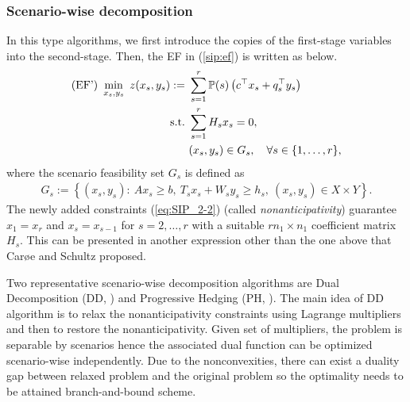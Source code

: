 \subsubsection{Scenario-wise decomposition}
In this type algorithms, we first introduce the copies of the first-stage variables into the second-stage. Then, the EF in (\ref{sip:ef}) is written as below.
\begin{subequations} \label{sip:ef'}
	\begin{align}
	\textrm{(EF') }\min_{x_s,y_s}\ z(x_s,y_s):=\ &\sum_{s=1}^{r}\PP(s)\left(c^{\top}x_s+q_s^{\top}y_s\right)	\label{eq:SIP_2-1}\\ 
	\mathrm{s.t.}\ &\sum_{s=1}^{r}H_s x_s=0, \label{eq:SIP_2-2} \\
	\ &(x_s,y_s)\in G_s,\quad \forall s\in\{1,\ldots,r\},	\label{eq:SIP_2-3}
	\end{align}
\end{subequations}
where the scenario feasibility set $G_s$ is defined as
\begin{align} 
G_s:=\left\{ (x_s,y_s): \ Ax_s\ge b,\  T_s x_s+W_s y_s\ge h_s,\ (x_s,y_s)\in X\times Y  \right\}. \label{eq:SIP_2-4}
\end{align}
The newly added constraints (\ref{eq:SIP_2-2}) (called \textit{nonanticipativity}) guarantee $x_1=x_r$ and $x_s=x_{s-1}$ for $s=2,\ldots,r$ with a suitable $rn_1\times n_1$ coefficient matrix $H_s$. This can be presented in another expression other than the one above that Car\o e and Schultz \cite{CS1999} proposed.

Two representative scenario-wise decomposition algorithms are Dual Decomposition (DD, \cite{CS1999}) and Progressive Hedging (PH, \cite{RW1991}). The main idea of DD algorithm is to relax the nonanticipativity constraints using Lagrange multipliers and then to restore the nonanticipativity. Given set of multipliers, the problem is separable by scenarios hence the associated dual function can be optimized scenario-wise independently. Due to the nonconvexities, there can exist a duality gap between relaxed problem and the original problem so the optimality needs to be attained branch-and-bound scheme.

